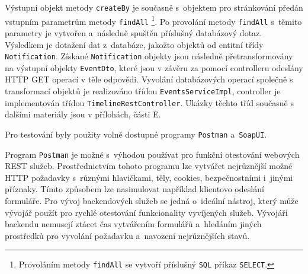 \documentclass[twoside, 12pt]{article}
\begin{document}
{\clearpage

Výstupní objekt metody \texttt{createBy} je současně s~objektem pro stránkování
předán vstupním parametrům metody \texttt{findAll}
\footnote{Provoláním metody \texttt{findAll} se vytvoří příslušný \texttt{SQL} příkaz \texttt{SELECT}.}.
Po provolání metody \texttt{findAll} s~těmito parametry je vytvořen a~následně spuštěn příslušný databázový dotaz.
Výsledkem je dotažení dat z~databáze, jakožto objektů od entitní třídy \texttt{Notification}.
Získané \texttt{Notification} objekty jsou následně přetransformovány na výstupní objekty \texttt{EventDto},
které jsou v závěru za pomocí controlleru odeslány HTTP GET operací v těle odpovědi.
Vyvolání databázových operací společně s transformací objektů je realizováno třídou \texttt{EventsServiceImpl},
controller je implementován třídou \texttt{TimelineRestController}.
Ukázky těchto tříd současně s dalšími materiály jsou v přílohách, části E.

\clearpage


Pro testování byly použity volně dostupné programy \texttt{Postman} a~\texttt{SoapUI}.

Program \texttt{Postman} je možné s~výhodou používat pro funkční otestování webových REST služeb.
Prostřednictvím tohoto programu lze vytvářet nejrůznější možné HTTP požadavky
s~různými hlavičkami, těly, cookies, bezpečnostními i~jinými příznaky.
Tímto způsobem lze nasimulovat například klientovo odeslání formuláře.
Pro vývoj backendových služeb se jedná o~ideální nástroj,
který může vývojář použít pro rychlé otestování funkcionality vyvíjených služeb.
Vývojáři backendu nemusejí ztácet čas vytvářením formulářů
a~hledáním jiných prostředků pro vyvolání požadavku a~navození nejrůznějších stavů.

\vspace{10}

}
\end{document}
